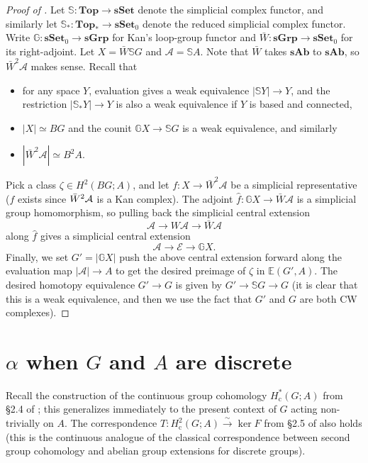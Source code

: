 \documentclass[12 pt]{article}
\theoremstyle{definition}
\newcommand{\E}{\mathbb{E}}
\newcommand{\iso}{\xrightarrow{\sim}}
\newcommand{\Hc}[1]{H_{\text{c}}^{#1}}
\newcommand{\bbS}{\mathbb{S}}
\begin{document}
\begin{proof}[Proof of ]
Let $\bbS:\textbf{Top}\to \textbf{sSet}$ denote the simplicial complex functor, and similarly let $\bbS_\ast:\textbf{Top}_\ast\to\textbf{sSet}_0$ denote the reduced simplicial complex functor. Write $\mathbb{G}:\textbf{sSet}_0\to \textbf{sGrp}$ for Kan's loop-group functor and $\bar W:\textbf{sGrp}\to\textbf{sSet}_0$ for its right-adjoint. Let $X=\bar W\bbS G$ and $\mathcal{A}=\bbS A$. Note that $\bar W$ takes $\textbf{sAb}$ to $\textbf{sAb}$, so $\bar W^2\mathcal{A}$ makes sense. Recall that
\begin{itemize}
\item for any space $Y$, evaluation gives a weak equivalence $|\bbS Y|\to Y$, and the restriction $|\bbS_\ast Y|\to Y$ is also a weak equivalence if $Y$ is based and connected,
\item $|X|\simeq BG$ and the counit $\mathbb{G}X\to \bbS G$ is a weak equivalence, and similarly\\
\item $|\bar W^2\mathcal{A}|\simeq B^2A$. 
\end{itemize}

Pick a class $\zeta\in H^2(BG;A)$, and let $f:X\to\bar{W}^2\mathcal{A}$ be a simplicial representative ($f$ exists since $\bar W^2\cal A$ is a Kan complex). The adjoint $\hat{f}:\mathbb{G}X\to\bar{W}\mathcal{A}$ is a simplicial group homomorphism, so pulling back the simplicial central extension
$$\mathcal{A}\to W\mathcal{A}\to \bar{W}\mathcal{A}$$
along $\hat{f}$ gives a simplicial central extension
$$\mathcal{A}\to \mathcal{E}\to \mathbb{G}X.$$
Finally, we set $G'=|\mathbb{G}X|$ push the above central extension forward along the evaluation map $|\mathcal{A}|\to A$ to get the desired preimage of $\zeta$ in $\E(G',A)$. The desired homotopy equivalence $G'\to G$ is given by $G'\to\bbS G\to G$ (it is clear that this is a weak equivalence, and then we use the fact that $G'$ and $G$ are both CW complexes). 
\end{proof}

\section{$\alpha$ when $G$ and $A$ are discrete}\label{G A discrete}

Recall the construction of the continuous group cohomology $\Hc{\ast}(G;A)$ from \S2.4 of \cite{Ja}; this generalizes immediately to the present context of $G$ acting non-trivially on $A$. The correspondence $T:\Hc2(G;A)\iso\ker F$ from \S2.5 of \cite{Ja} also holds (this is the continuous analogue of the classical correspondence between second group cohomology and abelian group extensions for discrete groups).
\end{document}

